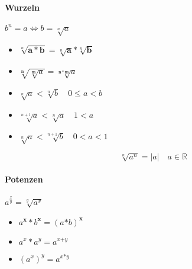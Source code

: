 \paragraph{Wurzeln} $b^n = a \Leftrightarrow b = \sqrt[n]{a}$

\begin{mzImportant}
  \begin{itemize}
    \item $\sqrt[n]{\mathbf{a * b}} = \sqrt[n]{\mathbf{a}} \mathbin{\boldsymbol{*}} \sqrt[n]{\mathbf{b}}$

    \item $\sqrt[\mathbf{n}]{ \sqrt[\mathbf{m}]{a} } = \sqrt[\mathbf{n * m}]{a}$

    \item $\sqrt[n]{a} < \sqrt[n]{b} \quad 0 \leq a < b$

    \item $\sqrt[n+1]{a} < \sqrt[n]{a} \quad 1 < a$

    \item $\sqrt[n]{a} < \sqrt[n+1]{b} \quad 0 < a < 1$
  \end{itemize}

  $$\sqrt[n]{a^n} = |a| \quad a \in \mathbb{R}$$
\end{mzImportant}


\paragraph{Potenzen} $a^{\frac{x}{y}} = \sqrt[y]{a^x}$

\begin{mzImportant}
  \begin{itemize}
    \item $a^{\mathbf{x}} * b^{\mathbf{x}} = (a \mathbf{*} b)^{\mathbf{x}}$

    \item $a^x * a^y = a^{x \boldsymbol{+} y}$

    \item $(a^x)^y = a^{x \boldsymbol{*} y}$

  \end{itemize}
\end{mzImportant}



